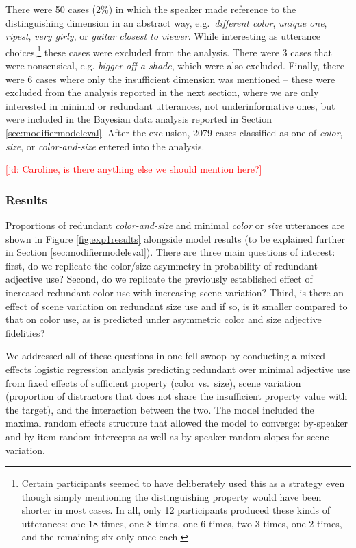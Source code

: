 \documentclass[11pt]{article}
\newcommand{\jd}[1]{\textcolor{Red}{[jd: #1]}}
\newcommand{\figref}[1]{Figure \ref{#1}}
\newcommand{\sectionref}[1]{Section \ref{#1}}
\begin{document}
There were 50 cases (2\%) in which the speaker made reference to the distinguishing dimension in an abstract way, e.g.~\emph{different color}, \emph{unique one}, \emph{ripest}, \emph{very girly}, or \emph{guitar closest to viewer}. While interesting as utterance choices,\footnote{Certain participants seemed to have deliberately used this as a strategy even though simply mentioning the distinguishing property would have been shorter in most cases. In all, only 12 participants produced these kinds of utterances: one 18 times, one 8 times, one 6 times, two 3 times, one 2 times, and the remaining six only once each.} these cases were excluded from the analysis. There were 3 cases that were nonsensical, e.g. \emph{bigger off a shade}, which were also excluded. Finally, there were 6 cases where only the insufficient dimension was mentioned -- these were excluded from the analysis reported in the next section, where we are only interested in minimal or redundant utterances, not underinformative ones, but were included in the Bayesian data analysis reported in \sectionref{sec:modifiermodeleval}. After the exclusion, 2079 cases classified as one of \emph{color}, \emph{size}, or \emph{color-and-size} entered into the analysis.

\jd{Caroline, is there anything else we should mention here?}

\subsubsection{Results}
\label{sec:modelempiricalresults}

Proportions of redundant \emph{color-and-size} and minimal \emph{color} or \emph{size} utterances are shown in \figref{fig:exp1results} alongside model results (to be explained further in \sectionref{sec:modifiermodeleval}). There are three main questions of interest: first, do we replicate the color/size asymmetry in probability of redundant adjective use? Second, do we replicate the previously established effect of increased redundant color use with increasing scene variation? Third, is there an effect of scene variation on redundant size use and if so, is it smaller compared to that on color use, as is predicted under asymmetric color and size adjective fidelities?

We addressed all of these questions in one fell swoop by conducting a mixed effects logistic regression analysis predicting redundant over minimal adjective use from fixed effects of sufficient property (color vs.~size), scene variation (proportion of distractors that does not share the insufficient property value with the target), and the interaction between the two. The model included the maximal random effects structure that allowed the model to converge: by-speaker and by-item random intercepts as well as by-speaker random slopes for scene variation. 
\end{document}
